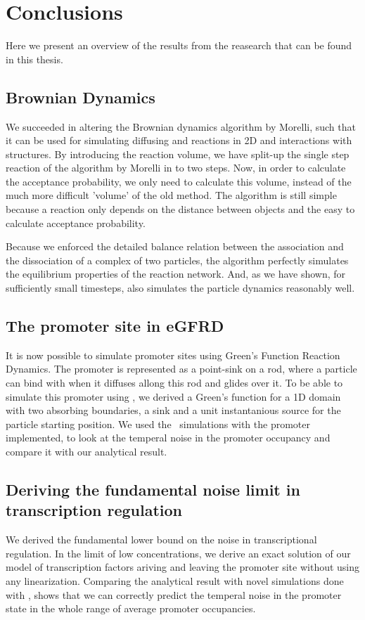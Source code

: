 \section{Conclusions}

Here we present an overview of the results from the reasearch that can be found in this thesis.

\subsection{Brownian Dynamics}
We succeeded in altering the Brownian dynamics algorithm by Morelli, such that it can be used for simulating diffusing and reactions in 2D and interactions with structures. By introducing the reaction volume, we have split-up the single step reaction of the algorithm by Morelli in to two steps. Now, in order to calculate the acceptance probability, we only need to calculate this volume, instead of the much more difficult 'volume' of the old method. The algorithm is still simple because a reaction only depends on the distance between objects and the easy to calculate acceptance probability. 

Because we enforced the detailed balance relation between the association and the dissociation of a complex of two particles, the algorithm perfectly simulates the equilibrium properties of the reaction network. And, as we have shown, for sufficiently small timesteps, also simulates the particle dynamics reasonably well. 

\subsection{The promoter site in eGFRD}
It is now possible to simulate promoter sites using Green's Function Reaction Dynamics. The promoter is represented as a point-sink on a rod, where a particle can bind with when it diffuses allong this rod and glides over it. To be able to simulate this promoter using \GFRD, we derived a Green's function for a 1D domain with two absorbing boundaries, a sink and a unit instantanious source for the particle starting position. We used the \GFRD\, simulations with the promoter implemented, to look at the temperal noise in the promoter occupancy and compare it with our analytical result. 

\subsection{Deriving the fundamental noise limit in transcription regulation}
We derived the fundamental lower bound on the noise in transcriptional regulation. In the limit of low concentrations, we derive an exact solution of our model of transcription factors ariving and leaving the promoter site without using any linearization. Comparing the analytical result with novel simulations done with \GFRD, shows that we can correctly predict the temperal noise in the promoter state in the whole range of average promoter occupancies. 

